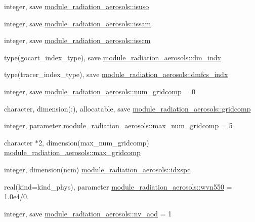 \begin{DoxyCompactItemize}
\item 
integer, save \hyperlink{namespacemodule__radiation__aerosols_acddb4dccea82201fd3b193c15c85ec78}{module\+\_\+radiation\+\_\+aerosols\+::isuso}
\item 
integer, save \hyperlink{namespacemodule__radiation__aerosols_ab64435256571a80bbb577fc4f27b39ee}{module\+\_\+radiation\+\_\+aerosols\+::issam}
\item 
integer, save \hyperlink{namespacemodule__radiation__aerosols_a762cff73e22fefab8adf68d08d5c4df1}{module\+\_\+radiation\+\_\+aerosols\+::isscm}
\item 
type(gocart\+\_\+index\+\_\+type), save \hyperlink{namespacemodule__radiation__aerosols_a70c58693c0aac6e4dbb6cf425fb0ce6a}{module\+\_\+radiation\+\_\+aerosols\+::dm\+\_\+indx}
\item 
type(tracer\+\_\+index\+\_\+type), save \hyperlink{namespacemodule__radiation__aerosols_ad6c4782fbaae13df20891197b67568ec}{module\+\_\+radiation\+\_\+aerosols\+::dmfcs\+\_\+indx}
\item 
integer, save \hyperlink{namespacemodule__radiation__aerosols_a6ddeb7b34ad2d6ab1575be3520e85891}{module\+\_\+radiation\+\_\+aerosols\+::num\+\_\+gridcomp} = 0
\item 
character, dimension(\+:), allocatable, save \hyperlink{namespacemodule__radiation__aerosols_a48c2c6c9c509f5c37fea5d788040ad7a}{module\+\_\+radiation\+\_\+aerosols\+::gridcomp}
\item 
integer, parameter \hyperlink{namespacemodule__radiation__aerosols_ad1187b5d87889c68cbe5929e20e83ac7}{module\+\_\+radiation\+\_\+aerosols\+::max\+\_\+num\+\_\+gridcomp} = 5
\item 
character $\ast$2, dimension(max\+\_\+num\+\_\+gridcomp) \hyperlink{namespacemodule__radiation__aerosols_ac8278b0db773d6ba6ab4d71c9bb1b109}{module\+\_\+radiation\+\_\+aerosols\+::max\+\_\+gridcomp}
\item 
integer, dimension(ncm) \hyperlink{namespacemodule__radiation__aerosols_a8ca79ca1e5161374aff3cad4121b360f}{module\+\_\+radiation\+\_\+aerosols\+::idxspc}
\item 
real(kind=kind\+\_\+phys), parameter \hyperlink{namespacemodule__radiation__aerosols_a4555a127ac5bab48353628ea81c55e4e}{module\+\_\+radiation\+\_\+aerosols\+::wvn550} = 1.\+0e4/0.
\item 
integer, save \hyperlink{namespacemodule__radiation__aerosols_a112670c954eb372efc017253b1096b17}{module\+\_\+radiation\+\_\+aerosols\+::nv\+\_\+aod} = 1
\end{DoxyCompactItemize}


